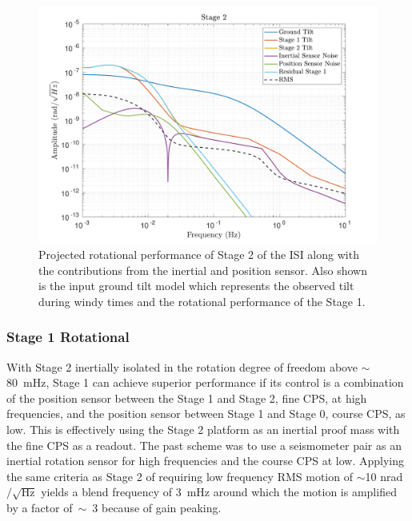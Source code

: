 \documentclass [12pt, proquest]{uwthesis}[2019]
\begin{document}
\begin{figure}[!h]
\begin{center}
\includegraphics[width=\textwidth]{cBRS_Model_ST2RX.pdf}
\caption[Projected rotational performance of Stage 2 of the ISI]{Projected rotational performance of Stage 2 of the ISI along with the contributions from the inertial and position sensor. Also shown is the input ground tilt model which represents the observed tilt during windy times and the rotational performance of the Stage 1.}
\label{cBRS2R}
\end{center}
\end{figure}

\subsubsection{Stage 1 Rotational}

With Stage 2 inertially isolated in the rotation degree of freedom above $\sim$80~mHz, Stage 1 can achieve superior performance if its control is a combination of the position sensor between the Stage 1 and Stage 2, fine CPS, at high frequencies, and the position sensor between Stage 1 and Stage 0, course CPS, as low. This is effectively using the Stage 2 platform as an inertial proof mass with the fine CPS as a readout. The past scheme was to use a seismometer pair as an inertial rotation sensor for high frequencies and the course CPS at low. Applying the same criteria as Stage 2 of requiring low frequency RMS motion of $\sim$10 nrad$/\sqrt{\text{Hz}}$ yields a blend frequency of 3~mHz around which the motion is amplified by a factor of~$\sim$~3 because of gain peaking. 
\end{document}
